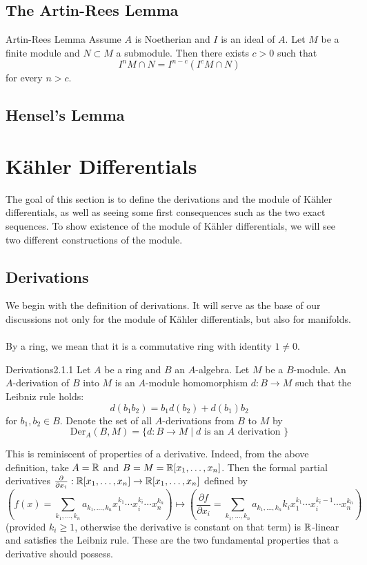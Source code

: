 \documentclass[a4paper]{article}
\begin{document}
\subsection{The Artin-Rees Lemma}
\begin{thm}{Artin-Rees Lemma}{} Assume $A$ is Noetherian and $I$ is an ideal of $A$. Let $M$ be a finite module and $N\subset M$ a submodule. Then there exists $c>0$ such that $$I^nM\cap N=I^{n-c}(I^cM\cap N)$$ for every $n>c$. 
\end{thm}

\subsection{Hensel's Lemma}

\section{Kähler Differentials}
The goal of this section is to define the derivations and the module of Kähler differentials, as well as seeing some first consequences such as the two exact sequences. To show existence of the module of Kähler differentials, we will see two different constructions of the module. 

\subsection{Derivations}
We begin with the definition of derivations. It will serve as the base of our discussions not only for the module of Kähler differentials, but also for manifolds. \\~\\

By a ring, we mean that it is a commutative ring with identity $1\neq 0$. 

\begin{defn}{Derivations}{2.1.1} Let $A$ be a ring and $B$ an $A$-algebra. Let $M$ be a $B$-module. An $A$-derivation of $B$ into $M$ is an $A$-module homomorphism $d:B\to M$ such that the Leibniz rule holds: $$d(b_1b_2)=b_1d(b_2)+d(b_1)b_2$$ for $b_1,b_2\in B$. Denote the set of all $A$-derivations from $B$ to $M$ by $$\text{Der}_A(B,M)=\{d:B\to M\;|\;d\text{ is an }A\text{ derivation }\}$$
\end{defn}

This is reminiscent of properties of a derivative. Indeed, from the above definition, take $A=\mathbb{R}$ and $B=M=\mathbb{R}[x_1,\dots,x_n]$. Then the formal partial derivatives $\frac{\partial}{\partial x_i}:\mathbb{R}[x_1,\dots,x_n]\to\mathbb{R}[x_1,\dots,x_n]$ defined by $$\left(f(x)=\sum_{k_1,\dots,k_n}a_{k_1,\dots,k_n}x_1^{k_1}\cdots x_i^{k_i}\cdots x_n^{k_n}\right)\mapsto\left(\frac{\partial f}{\partial x_i}=\sum_{k_1,\dots,k_n}a_{k_1,\dots,k_n}k_ix_1^{k_1}\cdots x_i^{k_i-1}\cdots x_n^{k_n}\right)$$ (provided $k_i\geq 1$, otherwise the derivative is constant on that term) is $\mathbb{R}$-linear and satisfies the Leibniz rule. These are the two fundamental properties that a derivative should possess. \\~\\
\end{document}
